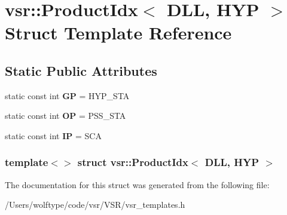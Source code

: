 \hypertarget{structvsr_1_1_product_idx_3_01_d_l_l_00_01_h_y_p_01_4}{\section{vsr\-:\-:Product\-Idx$<$ D\-L\-L, H\-Y\-P $>$ Struct Template Reference}
\label{structvsr_1_1_product_idx_3_01_d_l_l_00_01_h_y_p_01_4}
}
\subsection*{Static Public Attributes}
\begin{DoxyCompactItemize}
\item 
\hypertarget{structvsr_1_1_product_idx_3_01_d_l_l_00_01_h_y_p_01_4_aa3dab8904ec6e960b802b0110f307283}{static const int {\bfseries G\-P} = H\-Y\-P\-\_\-\-S\-T\-A}\label{structvsr_1_1_product_idx_3_01_d_l_l_00_01_h_y_p_01_4_aa3dab8904ec6e960b802b0110f307283}

\item 
\hypertarget{structvsr_1_1_product_idx_3_01_d_l_l_00_01_h_y_p_01_4_a0e09736924ca66f7071e63b60e3f0416}{static const int {\bfseries O\-P} = P\-S\-S\-\_\-\-S\-T\-A}\label{structvsr_1_1_product_idx_3_01_d_l_l_00_01_h_y_p_01_4_a0e09736924ca66f7071e63b60e3f0416}

\item 
\hypertarget{structvsr_1_1_product_idx_3_01_d_l_l_00_01_h_y_p_01_4_a9ede9afe7e389f4b6cbff4ff5c43e34a}{static const int {\bfseries I\-P} = S\-C\-A}\label{structvsr_1_1_product_idx_3_01_d_l_l_00_01_h_y_p_01_4_a9ede9afe7e389f4b6cbff4ff5c43e34a}

\end{DoxyCompactItemize}
\subsubsection*{template$<$$>$ struct vsr\-::\-Product\-Idx$<$ D\-L\-L, H\-Y\-P $>$}



The documentation for this struct was generated from the following file\-:\begin{DoxyCompactItemize}
\item 
/\-Users/wolftype/code/vsr/\-V\-S\-R/vsr\-\_\-templates.\-h\end{DoxyCompactItemize}
